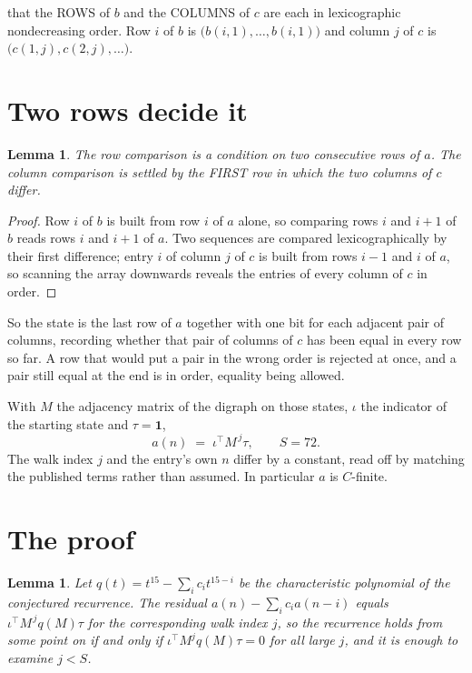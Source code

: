 \documentclass[11pt,a4paper]{article}
\theoremstyle{plain}
\newtheorem{lemma}[theorem]{Lemma}
\theoremstyle{definition}
\begin{document}
that the ROWS of $b$ and the COLUMNS of $c$ are each in lexicographic nondecreasing order. Row $i$ of $b$
is $\bigl(b(i,1),\dots,b(i,1)\bigr)$ and column $j$ of $c$ is
$\bigl(c(1,j),c(2,j),\dots\bigr)$.


\section{Two rows decide it}

\begin{lemma}\label{lem:win}
The row comparison is a condition on two consecutive rows of $a$. The column comparison is
settled by the FIRST row in which the two columns of $c$ differ.
\end{lemma}

\begin{proof}
Row $i$ of $b$ is built from row $i$ of $a$ alone, so comparing rows $i$ and $i+1$ of $b$ reads
rows $i$ and $i+1$ of $a$. Two sequences are compared lexicographically by their first
difference; entry $i$ of column $j$ of $c$ is built from rows $i-1$ and $i$ of $a$, so scanning
the array downwards reveals the entries of every column of $c$ in order.
\end{proof}

So the state is the last row of $a$ together with one bit for each adjacent pair of columns,
recording whether that pair of columns of $c$ has been equal in every row so far. A row that
would put a pair in the wrong order is rejected at once, and a pair still equal at the end is
in order, equality being allowed.

With $M$ the adjacency matrix of the digraph on those states, $\iota$ the indicator of the
starting state and $\tau=\mathbf{1}$,
\[
a(n)\;=\;\iota^{\!\top}M^{\,j}\tau ,\qquad S=72.
\]
The walk index $j$ and the entry's own $n$ differ by a constant, read off by matching the
published terms rather than assumed. In particular $a$ is $C$-finite.

\section{The proof}

\begin{lemma}\label{lem:crit}
Let $q(t)=t^{15}-\sum_i c_it^{15-i}$ be the characteristic polynomial of the
conjectured recurrence. The residual $a(n)-\sum_ic_ia(n-i)$ equals
$\iota^{\!\top}M^{\,j}q(M)\tau$ for the corresponding walk index $j$, so the recurrence
holds from some point on if and only if $\iota^{\!\top}M^{j}q(M)\tau=0$ for all large $j$,
and it is enough to examine $j<S$.
\end{lemma}
\end{document}
